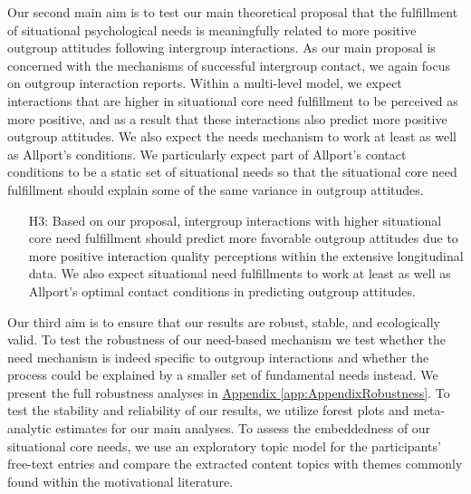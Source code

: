 \documentclass[man, 12pt, a4paper, mask]{apa7}
\theoremstyle{break}
\theoremstyle{plain}
\newcommand{\appref}[2][]{\hyperref[#2]{Appendix \ref*{#2}#1}}
\begin{document}
Our second main aim is to test our main theoretical proposal that the fulfillment of situational psychological needs is meaningfully related to more positive outgroup attitudes following intergroup interactions. As our main proposal is concerned with the mechanisms of successful intergroup contact, we again focus on outgroup interaction reports. Within a multi-level model, we expect interactions that are higher in situational core need fulfillment to be perceived as more positive, and as a result that these interactions also predict more positive outgroup attitudes. We also expect the needs mechanism to work at least as well as Allport's conditions. We particularly expect part of Allport's contact conditions to be a static set of situational needs so that the situational core need fulfillment should explain some of the same variance in outgroup attitudes.
\begin{enumerate}[leftmargin=1.5\parindent]
    \item[H3:] Based on our proposal, intergroup interactions with higher situational core need fulfillment should predict more favorable outgroup attitudes due to more positive interaction quality perceptions within the extensive longitudinal data. We also expect situational need fulfillments to work at least as well as Allport's optimal contact conditions in predicting outgroup attitudes.
\end{enumerate}

Our third aim is to ensure that our results are robust, stable, and ecologically valid. To test the robustness of our need-based mechanism we test whether the need mechanism is indeed specific to outgroup interactions and whether the process could be explained by a smaller set of fundamental needs instead. We present the full robustness analyses in \appref{app:AppendixRobustness}. To test the stability and reliability of our results, we utilize forest plots and meta-analytic estimates for our main analyses. To assess the embeddedness of our situational core needs, we use an exploratory topic model for the participants' free-text entries and compare the extracted content topics with themes commonly found within the motivational literature.
\end{document}
